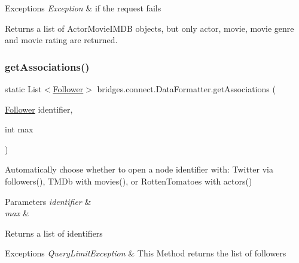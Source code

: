 \begin{DoxyExceptions}{Exceptions}
{\em Exception} & if the request fails\\
\hline
\end{DoxyExceptions}
\begin{DoxyReturn}{Returns}
a list of Actor\+Movie\+I\+M\+DB objects, but only actor, movie, movie genre and movie rating are returned. 
\end{DoxyReturn}
\mbox{\label{classbridges_1_1connect_1_1_data_formatter_a3877fbdef4320f03dba7f2a6832adfbb}} 
\subsubsection{\texorpdfstring{get\+Associations()}{getAssociations()}\hspace{0.1cm}{\footnotesize\ttfamily [1/5]}}
{\footnotesize\ttfamily static List$<$\mbox{\hyperlink{classbridges_1_1data__src__dependent_1_1_follower}{Follower}}$>$ bridges.\+connect.\+Data\+Formatter.\+get\+Associations (\begin{DoxyParamCaption}\item[{\mbox{\hyperlink{classbridges_1_1data__src__dependent_1_1_follower}{Follower}}}]{identifier,  }\item[{int}]{max }\end{DoxyParamCaption})\hspace{0.3cm}{\ttfamily [static]}}

Automatically choose whether to open a node identifier with\+: Twitter via followers(), T\+M\+Db with movies(), or Rotten\+Tomatoes with actors()


\begin{DoxyParams}{Parameters}
{\em identifier} & \\
\hline
{\em max} & \\
\hline
\end{DoxyParams}
\begin{DoxyReturn}{Returns}
a list of identifiers 
\end{DoxyReturn}

\begin{DoxyExceptions}{Exceptions}
{\em Query\+Limit\+Exception} & This Method returns the list of followers \\
\hline
\end{DoxyExceptions}

